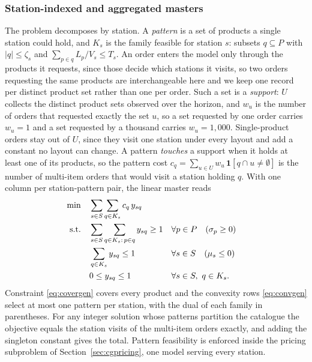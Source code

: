 \documentclass[]{interact}
\begin{document}
\subsubsection{Station-indexed and aggregated masters}\label{sec:cgmaster}
The problem decomposes by station. A \emph{pattern} is a set of products a single station could hold, and $K_s$ is the family feasible for station $s$: subsets $q \subseteq P$ with $|q| \le \zeta_s$ and $\sum_{p \in q} L_p / V_s \le T_s$. An order enters the model only through the products it requests, since those decide which stations it visits, so two orders requesting the same products are interchangeable here and we keep one record per distinct product set rather than one per order. Such a set is a \emph{support}: $U$ collects the distinct product sets observed over the horizon, and $w_u$ is the number of orders that requested exactly the set $u$, so a set requested by one order carries $w_u = 1$ and a set requested by a thousand carries $w_u = 1{,}000$. Single-product orders stay out of $U$, since they visit one station under every layout and add a constant no layout can change. A pattern \emph{touches} a support when it holds at least one of its products, so the pattern cost $c_q = \sum_{u \in U} w_u\,\mathbf{1}[q \cap u \neq \emptyset]$ is the number of multi-item orders that would visit a station holding $q$. With one column per station-pattern pair, the linear master reads
\begin{align}
\min \quad & \sum_{s \in S} \sum_{q \in K_s} c_q\, y_{sq} \notag\\
\text{s.t.} \quad
& \sum_{s \in S} \sum_{q \in K_s:\, p \in q} y_{sq} \ge 1 && \forall p \in P \quad (\sigma_p \ge 0) \label{eq:covergen}\\
& \sum_{q \in K_s} y_{sq} \le 1 && \forall s \in S \quad (\mu_s \le 0) \label{eq:convgen}\\
& 0 \le y_{sq} \le 1 && \forall s \in S,\ q \in K_s. \notag
\end{align}
Constraint \eqref{eq:covergen} covers every product and the convexity rows \eqref{eq:convgen} select at most one pattern per station, with the dual of each family in parentheses. For any integer solution whose patterns partition the catalogue the objective equals the station visits of the multi-item orders exactly, and adding the singleton constant gives the total. Pattern feasibility is enforced inside the pricing subproblem of Section~\ref{sec:cgpricing}, one model serving every station.
\end{document}

